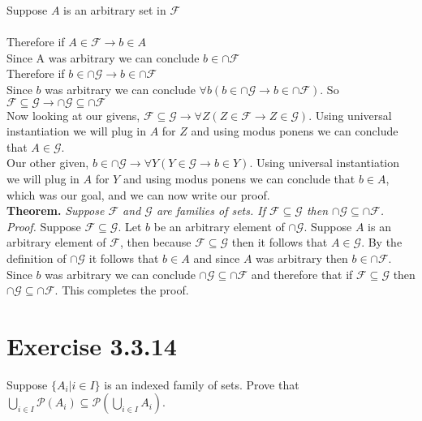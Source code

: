 \documentclass{article}
\newcommand{\n}{ \noindent }
\newcommand{\F}{\mathcal{F}}
\newcommand{\G}{\mathcal{G}}
\newcommand{\pwset}{\mathscr{P}}
\begin{document}
\indent \indent Suppose $A$ is an arbitrary set in $\F$ \\
\indent \indent \indent [proof of $b \in A$ ] \\
\indent \indent Therefore if $A \in \F \rightarrow b \in A $ \\
\indent \indent Since A was arbitrary we can conclude $b \in \cap \F$ \\
\indent Therefore if $b \in \cap \G \rightarrow b \in \cap \F$ \\
\n Since $b$ was arbitrary we can conclude $\forall b (b \in \cap \G \rightarrow b \in \cap \F)$. So $\F \subseteq \G \rightarrow \cap \G \subseteq \cap \F$ \\


\n Now looking at our givens, $\F \subseteq \G \rightarrow \forall Z ( Z \in \F \rightarrow Z \in \G)$. Using universal instantiation we will plug in $A$ for $Z$ and using modus ponens we can conclude that $A \in \G$. \\

\n Our other given, $b \in \cap \G \rightarrow \forall Y (Y \in \G \rightarrow b \in Y)$. Using universal instantiation we will plug in $A$ for $Y$ and using modus ponens we can conclude that $b \in A$, which was our goal, and we can now write our proof. \\


\n \textbf{Theorem.} \textit{Suppose $\F$ and $\G$ are families of sets. If $\F \subseteq \G$ then 
$\cap \G \subseteq \cap \F$.}
\n \textit{Proof.} Suppose $\F \subseteq \G$. Let $b$ be an arbitrary element of $\cap \G$. Suppose $A$ is an arbitrary element of $\F$, then because $\F \subseteq \G$ then it follows that $A \in \G$. By the definition of $\cap \G$ it follows that $b \in A$ and since $A$ was arbitrary then $b \in \cap \F$. Since $b$ was arbitrary we can conclude $\cap \G \subseteq \cap \F$ and therefore that if $\F \subseteq \G$ then $\cap \G \subseteq \cap \F$. This completes the proof.



\section*{Exercise 3.3.14}

Suppose $\{ A_{i} | i \in I \} $ is an indexed family of sets. Prove that $\bigcup_{i \in I} \pwset(A_{i}) \subseteq \pwset (\bigcup_{i \in I} A_{i})$. \\
\end{document}
